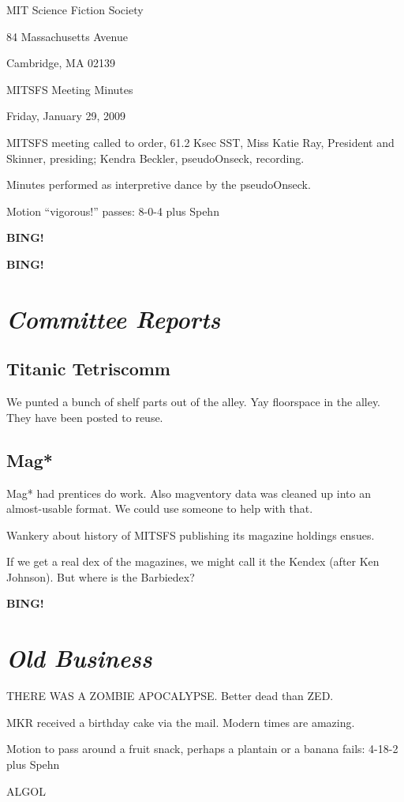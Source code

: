 \documentclass[10pt]{article}
\newcommand{\bing}{{\bf BING!} }
\newcommand{\goto}[1]{\bing \vskip 12pt \section*{{\em{#1}}}}
\newcommand{\ps}{ plus Spehn\xspace}
\newcommand{\skinner}{Miss Katie Ray, President and Skinner}
\newcommand{\onseck}{Kendra Beckler, pseudoOnseck}
\newcommand{\meetingdate}{Friday, January 29, 2009}
\begin{document}
\begin{center}

MIT Science Fiction Society

84 Massachusetts Avenue

Cambridge, MA 02139

\vspace{12pt}

MITSFS Meeting Minutes

\meetingdate

\end{center}

\vspace{18pt}

\setlength{\parskip}{6pt}

\noindent
MITSFS meeting called to order, 61.2 Ksec SST,
\skinner, presiding; \onseck, recording.

Minutes performed as interpretive dance by the pseudoOnseck.

Motion ``vigorous!'' passes: 8-0-4 \ps

\bing

\goto{Committee Reports}

\subsection*{Titanic Tetriscomm}
We punted a bunch of shelf parts out of the alley.  Yay floorspace in the
 alley.  They have been posted to reuse.

\subsection*{Mag*}
Mag* had prentices do work.  Also magventory data was cleaned up into an 
almost-usable format.  We could use someone to help with that.

Wankery about history of MITSFS publishing its magazine holdings ensues.

If we get a real dex of the magazines, we might call it the Kendex (after Ken 
Johnson).  But where is the Barbiedex?

\goto{Old Business}

THERE WAS A ZOMBIE APOCALYPSE.  Better dead than ZED.

MKR received a birthday cake via the mail.  Modern times are amazing.

Motion to pass around a fruit snack, perhaps a plantain or a banana fails: 
4-18-2 \ps

ALGOL
\end{document}
